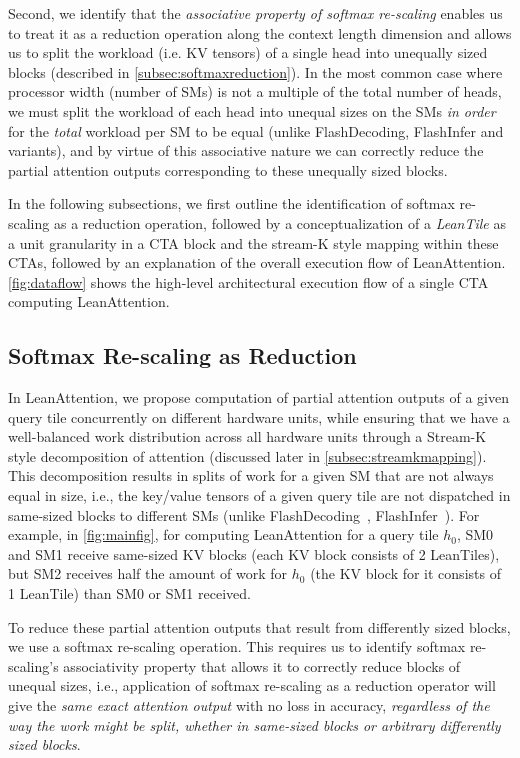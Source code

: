 Second, we identify that the \emph{associative property of softmax re-scaling} enables us to treat it as a reduction operation along the context length dimension and allows us to split the workload (i.e. KV tensors) of a single head into unequally sized blocks (described in \autoref{subsec:softmaxreduction}). In the most common case where processor width (number of SMs) is not a multiple of the total number of heads, we must split the workload of each head into unequal sizes on the SMs \textit{in order} for the \textit{total} workload per SM to be equal (unlike FlashDecoding, FlashInfer and variants), and by virtue of this associative nature we can correctly reduce the partial attention outputs corresponding to these unequally sized blocks.

In the following subsections, we first outline the identification of softmax re-scaling as a reduction operation, followed by a conceptualization of a \textit{LeanTile} as a unit granularity in a CTA block and the stream-K style mapping within these CTAs, followed by an explanation of the overall execution flow of LeanAttention. \autoref{fig:dataflow} shows the high-level architectural execution flow of a single CTA computing LeanAttention.

\subsection{Softmax Re-scaling as Reduction}
\label{subsec:softmaxreduction}

In LeanAttention, we propose computation of partial attention outputs of a given query tile concurrently on different hardware units, while ensuring that we have a well-balanced work distribution across all hardware units through a Stream-K style decomposition of attention (discussed later in \autoref{subsec:streamkmapping}). This decomposition results in splits of work for a given SM that are not always equal in size, i.e., the key/value tensors of a given query tile are not dispatched in same-sized blocks to different SMs (unlike FlashDecoding~\cite{flashdecoding}, FlashInfer~\cite{flashinfer}). For example, in \autoref{fig:mainfig}, for computing LeanAttention for a query tile $h_0$, SM0 and SM1 receive same-sized KV blocks (each KV block consists of 2 LeanTiles), but SM2 receives half the amount of work for $h_0$ (the KV block for it consists of 1 LeanTile) than SM0 or SM1 received. 

To reduce these partial attention outputs that result from differently sized blocks, we use a softmax re-scaling operation. This requires us to identify softmax re-scaling's associativity property that allows it to correctly reduce blocks of unequal sizes, i.e., application of softmax re-scaling as a reduction operator will give the \emph{same exact attention output} with no loss in accuracy, \textit{regardless of the way the work might be split, whether in same-sized blocks or arbitrary differently sized blocks}.

